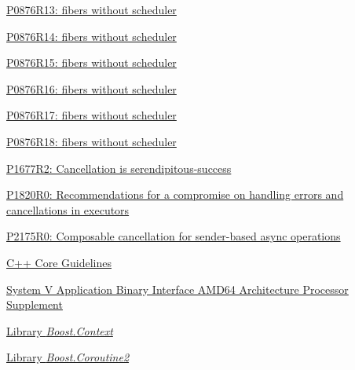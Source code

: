 \begin{thebibliography}{99}
        \href{https://www.open-std.org/jtc1/sc22/wg21/docs/papers/2023/p0876r13.pdf}
        {P0876R13: fibers without scheduler}

        \href{https://www.open-std.org/jtc1/sc22/wg21/docs/papers/2023/p0876r14.pdf}
        {P0876R14: fibers without scheduler}

        \href{https://www.open-std.org/jtc1/sc22/wg21/docs/papers/2024/p0876r15.pdf}
        {P0876R15: fibers without scheduler}

        \href{https://www.open-std.org/jtc1/sc22/wg21/docs/papers/2024/p0876r16.pdf}
        {P0876R16: fibers without scheduler}

        \href{https://www.open-std.org/jtc1/sc22/wg21/docs/papers/2024/p0876r17.pdf}
        {P0876R17: fibers without scheduler}

        \href{https://www.open-std.org/jtc1/sc22/wg21/docs/papers/2024/p0876r18.pdf}
        {P0876R18: fibers without scheduler}

        \href{https://www.open-std.org/jtc1/sc22/wg21/docs/papers/2019/p1677r2.pdf}
        {P1677R2: Cancellation is serendipitous-success}

        \href{https://www.open-std.org/jtc1/sc22/wg21/docs/papers/2019/p1820r0.html}
        {P1820R0: Recommendations for a compromise on handling errors and cancellations in executors}

        \href{https://www.open-std.org/jtc1/sc22/wg21/docs/papers/2020/p2175r0.html}
        {P2175R0: Composable cancellation for sender-based async operations}

        \href{http://isocpp.github.io/CppCoreGuidelines/CppCoreGuidelines#Ri-global}
        {C++ Core Guidelines}

        \href{http://software.intel.com/sites/default/files/article/402129/mpx-linux64-abi.pdf}
        {System V Application Binary Interface AMD64 Architecture Processor
        Supplement}

        \href{http://www.boost.org/doc/libs/release/libs/context/doc/html/index.html}
        {Library \emph{Boost.Context}}

        \href{http://www.boost.org/doc/libs/release/libs/coroutine2/doc/html/index.html}
        {Library \emph{Boost.Coroutine2}}


\end{thebibliography}
